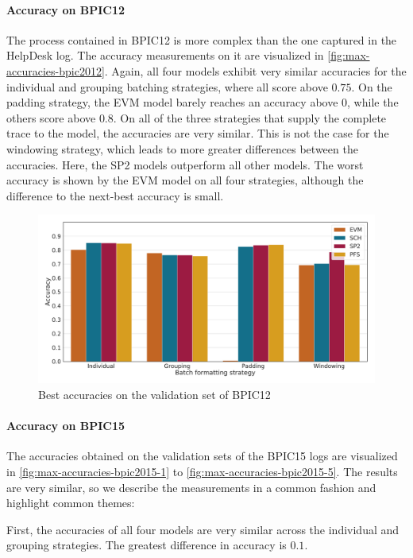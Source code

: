 \paragraph{Accuracy on BPIC12}
The process contained in BPIC12 is more complex than the one captured in the HelpDesk log.
The accuracy measurements on it are visualized in \autoref{fig:max-accuracies-bpic2012}.
Again, all four models exhibit very similar accuracies for the individual and grouping batching strategies, where all score above $0.75$.
On the padding strategy, the EVM model barely reaches an accuracy above $0$, while the others score above $0.8$.
On all of the three strategies that supply the complete trace to the model, the accuracies are very similar.
This is not the case for the windowing strategy, which leads to more greater differences between the accuracies.
Here, the SP2 models outperform all other models.
The worst accuracy is shown by the EVM model on all four strategies, although the difference to the next-best accuracy is small.

\begin{figure}
    \centering
    \includegraphics[width=\textwidth]{gfx/bpic2012/accuracies.pdf}
    \caption{Best accuracies on the validation set of BPIC12}
    \label{fig:max-accuracies-bpic2012}
\end{figure}
\FloatBarrier

\paragraph{Accuracy on BPIC15}
The accuracies obtained on the validation sets of the BPIC15 logs are visualized in \autoref{fig:max-accuracies-bpic2015-1} to \autoref{fig:max-accuracies-bpic2015-5}.
The results are very similar, so we describe the measurements in a common fashion and highlight common themes:

First, the accuracies of all four models are very similar across the individual and grouping strategies.
The greatest difference in accuracy is $0.1$.

